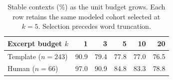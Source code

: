 \begin{table}[t]
\centering\small
\begin{tabular}{@{}lrrrrr@{}}
\toprule
Excerpt budget $k$ & 1 & 3 & 5 & 10 & 20\\
\midrule
Template ($n=243$) & 90.9 & 79.4 & 77.8 & 77.0 & 76.5\\
Human ($n=66$) & 97.0 & 90.9 & 84.8 & 83.3 & 78.8\\
\bottomrule
\end{tabular}
\caption{Stable contexts (\%) as the unit budget grows. Each row retains the same modeled cohort selected at $k=5$. Selection precedes word truncation.}
\label{tab:budget}
\end{table}

